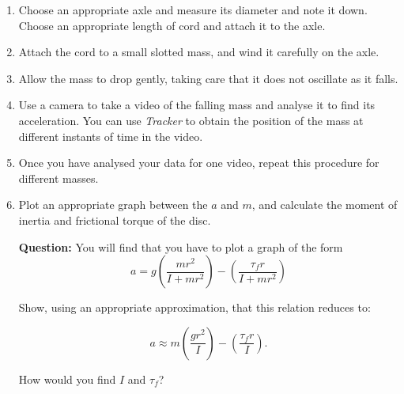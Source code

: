 \begin{enumerate}
    \item Choose an appropriate axle and measure its diameter and note it down. Choose an appropriate length of cord and attach it to the axle.
    
    \item Attach the cord to a small slotted mass, and wind it carefully on the axle.
    
    \item Allow the mass to drop gently, taking care that it does not oscillate as it falls.
    
    \item Use a camera to take a video of the falling mass and analyse it to find its acceleration. You can use \textsl{Tracker} to obtain the position of the mass at different instants of time in the video.
    
    \item Once you have analysed your data for one video, repeat this procedure for different masses. 
    
    \item Plot an appropriate graph between the $a$ and $m$, and calculate the moment of inertia and frictional torque of the disc.
    
    
    
    
    \vspace{\parskip}
    \begin{question}
    \textbf{Question:} You will find that you have to plot a graph of the form
    \begin{equation*}
        a =  g \left( \frac{m r^2}{I + mr^2}\right) - \left( \frac{\tau_f r}{I + mr^2}\right)
    \end{equation*}
    
    Show, using an appropriate approximation, that this relation reduces to:
    
    \begin{equation}
        a \approx m \left( \frac{g r^2}{I}\right) - \left( \frac{\tau_f r}{I}\right).
    \end{equation}
    
    How would you find $I$ and $\tau_f$?
    \end{question}
    
\end{enumerate}

